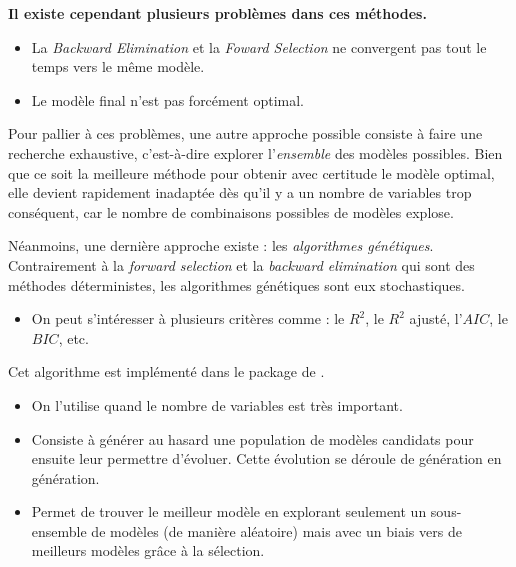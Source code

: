 \documentclass[
  12pt,
]{report}
\providecommand{\tightlist}{%
  \setlength{\itemsep}{0pt}\setlength{\parskip}{0pt}}\usepackage{longtable,booktabs,array}
\renewcommand{\texttt}[1]{\colorbox{light}{\color{highlight}{\ttfamily{#1}}}}
\begin{document}
\begin{tcolorbox}[enhanced jigsaw, leftrule=.75mm, opacityback=0, bottomtitle=1mm, title=\textcolor{quarto-callout-warning-color}{\faExclamationTriangle}\hspace{0.5em}{Limites}, colbacktitle=quarto-callout-warning-color!10!white, opacitybacktitle=0.6, coltitle=black, colback=white, left=2mm, breakable, arc=.35mm, toptitle=1mm, titlerule=0mm, toprule=.15mm, rightrule=.15mm, colframe=quarto-callout-warning-color-frame, bottomrule=.15mm]

\textbf{Il existe cependant plusieurs problèmes dans ces méthodes.}

\begin{itemize}
\item
  La \emph{Backward Elimination} et la \emph{Foward Selection} ne
  convergent pas tout le temps vers le même modèle.
\item
  Le modèle final n'est pas forcément optimal.
\end{itemize}

\end{tcolorbox}

Pour pallier à ces problèmes, une autre approche possible consiste à
faire une recherche exhaustive, c'est-à-dire explorer l'\emph{ensemble}
des modèles possibles. Bien que ce soit la meilleure méthode pour
obtenir avec certitude le modèle optimal, elle devient rapidement
inadaptée dès qu'il y a un nombre de variables trop conséquent, car le
nombre de combinaisons possibles de modèles explose.

Néanmoins, une dernière approche existe : les \emph{algorithmes
génétiques}. Contrairement à la \emph{forward selection} et la
\emph{backward elimination} qui sont des méthodes déterministes, les
algorithmes génétiques sont eux stochastiques.

\begin{itemize}
\tightlist
\item
  On peut s'intéresser à plusieurs critères comme : le \(R^2\), le
  \(R^2\) ajusté, l'\(AIC\), le \(BIC\), etc.
\end{itemize}

Cet algorithme est implémenté dans le package  de
\texttt{\{glmulti\}}.

\begin{itemize}
\item
  On l'utilise quand le nombre de variables est très important.
\item
  Consiste à générer au hasard une population de modèles candidats pour
  ensuite leur permettre d'évoluer. Cette évolution se déroule de
  génération en génération.
\item
  Permet de trouver le meilleur modèle en explorant seulement un
  sous-ensemble de modèles (de manière aléatoire) mais avec un biais
  vers de meilleurs modèles grâce à la sélection.
\end{itemize}
\end{document}
